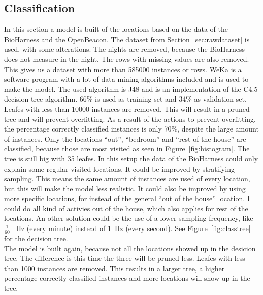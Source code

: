 	\subsection{Classification}
	\label{sec:classification}
	In this section a model is built of the locations based on the data of the BioHarness and the OpenBeacon. The dataset from Section~\ref{sec:rawdataset}  is used, with some alterations. The nights are removed, because the BioHarness does not measure in the night. The rows with missing values are also removed. This gives us a dataset with more than 585000 instances or rows. WeKa \cite{weka} is a software program with a lot of data mining algorithms included and is used to make the model. The used algorithm is J48 and is an implementation of the C4.5 \cite{quinlan1993c4} decision tree algorithm. 66\% is used as training set and 34\% as validation set. Leafes with less than 10000 instances are removed. This will result in a pruned tree and will prevent overfitting. As a result of the actions to prevent overfitting, the percentage correctly classified instances is only 70\%, despite the large amount of instances. Only the locations ``out'', ``bedroom'' and ``rest of the house'' are classified, because those are most visited as seen in Figure~\ref{fig:histogram}. The tree is still big with 35 leafes. In this setup the data of the BioHarness could only explain some regular visited locations. It could be improved by stratifying sampling. This means the same amount of instances are used of every location, but this will make the model less realistic. It could also be improved by using more specific locations, for instead of the general ``out of the house'' location. I could do all kind of activies out of the house, which also applies for rest of the locations. An other solution could be the use of a lower sampling frequency, like $\frac{1}{60}$ \SI{}{\hertz} (every minute) instead of \SI{1}{\hertz} (every second). See Figure~\ref{fig:classtree} for the decision tree. \\
	The model is built again, because not all the locations showed up in the desicion tree. The difference is this time the three will be pruned less. Leafes with less than 1000 instances are removed. This results in a larger tree, a higher percentage correctly classified instances and more locations will show up in the tree.


